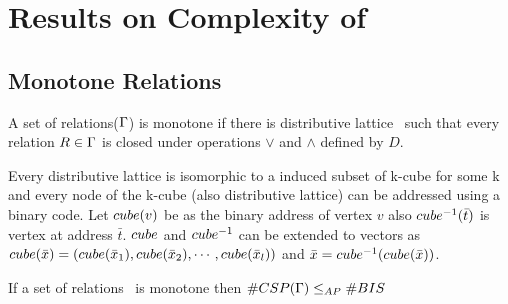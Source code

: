 \chapter{Results on Complexity of \cbis}
\section{Monotone Relations}
\begin{defi}
A set of relations(\(\Gamma\))  is monotone if there is distributive
lattice \mD\ such that every relation \(R \in \Gamma\) is closed under
operations \(\vee\) and \(\wedge\) defined by \(D\)\@.
\end{defi}

Every distributive lattice is isomorphic to a induced subset of k-cube for 
some k and every node of the k-cube (also distributive lattice) can be 
addressed using a binary code.
Let \(cube(v)\) be as the binary address of vertex \(v\) also
\(cube^{-1}(\bar t)\) is vertex at address \(\bar t\)\@.
\(cube\) and \(cube^{-1}\) can be extended to vectors as
\(cube(\bar x) = (cube(\bar x_1),cube(\bar x_2), \cdots, cube(\bar x_l))\) 
and \(\bar x = cube^{-1}(cube(\bar x))\).

\begin{theorem} \label{theorem:binary}
If a set of relations \mrelset\ is monotone then \(\#CSP(\Gamma) \le_{AP} \#BIS\)
\end{theorem}

